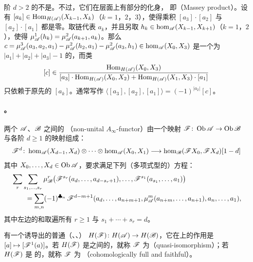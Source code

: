 \begin{remark}\label{thm:massey-products}
阶 $d>2$ 的\trComposition{}不是\trChainMap。不过，它们在\trCohomology{}层面上有部分的化身，
即\textbf{\trMasseyProduct}（Massey product）。设有\trMorphism{}%
$[a_k]\in\operatorname{Hom}_{H(\mathscr{A})}(X_{k-1},X_k)$（$k=1$，$2$，$3$），使得乘积 $[a_3]\cdot[a_2]$
与 $[a_2]\cdot[a_1]$ 都是零。取链代表 $a_k$，并且另取
$h_k\in\hom_{\mathscr{A}}(X_{k-1},X_{k+1})$（$k=1$，$2$），使得
$\mu^1_{\mathscr{A}}(h_k)=\mu^2_{\mathscr{A}}(a_{k+1},a_k)$。那么
$c=\mu^3_{\mathscr{A}}(a_3,a_2,a_1)-\mu^2_{\mathscr{A}}(h_2,a_1)-\mu^2_{\mathscr{A}}(a_3,h_1)
\in\hom_{\mathscr{A}}(X_0,X_3)$ 是一个\trDegree{}为 $|a_1|+|a_2|+|a_3|-1$ 的\trCocycle，而类
\begin{equation}\label{eq:massey-class}
[c]\in\frac{\operatorname{Hom}_{H(\mathscr{A})}(X_0,X_3)}
{[a_3]\cdot\operatorname{Hom}_{H(\mathscr{A})}(X_0,X_2)+\operatorname{Hom}_{H(\mathscr{A})}(X_1,X_3)\cdot[a_1]}
\end{equation}
只依赖于原先的 $[a_k]$。通常写作
$\langle[a_3],[a_2],[a_1]\rangle=(-1)^{|a_2|}[c]$。
\end{remark}

\paragraph{\trFunctor。}\label{sub:functors}
两个\trNonunital{}\trACategory{} $\mathscr{A}$、$\mathscr{B}$ 之间的
\textbf{\trNonunital{}\trAFunctor}（non-unital $A_\infty$-functor）由一个映射
$\mathscr{F}\colon\operatorname{Ob}\mathscr{A}\to\operatorname{Ob}\mathscr{B}$ 与各阶 $d\ge 1$ 的\trMultilinear{}映射组成：
\begin{equation}\label{eq:afunctor-components}
\mathscr{F}^d\colon\hom_{\mathscr{A}}(X_{d-1},X_d)\otimes\cdots\otimes\hom_{\mathscr{A}}(X_0,X_1)
\longrightarrow\hom_{\mathscr{B}}(\mathscr{F}X_0,\mathscr{F}X_d)[1-d]
\end{equation}
其中 $X_0,\ldots,X_d\in\operatorname{Ob}\mathscr{A}$，要求满足下列（多项式型的）方程：
\begin{equation}\label{eq:afunctor-equations}
\begin{split}
&\sum_r\sum_{s_1,\ldots,s_r}\mu^r_{\mathscr{B}}
\bigl(\mathscr{F}^{s_r}(a_d,\ldots,a_{d-s_r+1}),\ldots,\mathscr{F}^{s_1}(a_{s_1},\ldots,a_1)\bigr)
\\
&\hspace{2em}=\sum_{m,n}(-1)^{\clubsuit_n}\,\mathscr{F}^{d-m+1}
(a_d,\ldots,a_{n+m+1},\mu^m_{\mathscr{A}}(a_{n+m},\ldots,a_{n+1}),a_n,\ldots,a_1),
\end{split}
\end{equation}
其中左边的和取遍所有 $r\ge 1$ 与\trPartition{} $s_1+\cdots+s_r=d$。

有一个诱导出的普通（\trLinear、\trGraded、\trNonunital）\trFunctor{}%
$H(\mathscr{F})\colon H(\mathscr{A})\to H(\mathscr{B})$，它在\trMorphism{}上的作用是
$[a]\mapsto[\mathscr{F}^1(a)]$。若 $H(\mathscr{F})$ 是\trCategory{}之间的\trIsomorphism，就称
$\mathscr{F}$ 为\textbf{\trQuasiisomorphism}（quasi-isomorphism）；若 $H(\mathscr{F})$ 是%
\trFullyFaithful{}的，就称 $\mathscr{F}$ 为\textbf{\trCohomology{}\trFullyFaithful}
（cohomologically full and faithful）。

